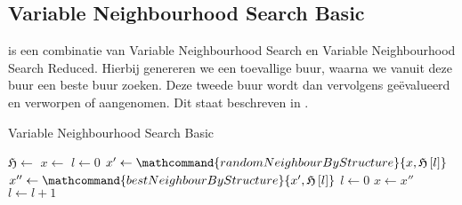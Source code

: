 \subsection{Variable Neighbourhood Search Basic}
 is een combinatie van Variable Neighbourhood Search en Variable Neighbourhood Search Reduced. Hierbij genereren we een toevallige buur, waarna we vanuit deze buur een beste buur zoeken. Deze tweede buur wordt dan vervolgens ge\"evalueerd en verworpen of aangenomen. Dit staat beschreven in .
\begin{algorithm}[htb]                      %
\caption{Variable Neighbourhood Search Basic}          %
\label{alg:variableNeighbourhoodSearchBasic}                           %
\begin{algorithmic}[1]                    %
\STATE $\mathfrak{H}\leftarrow$
\STATE $x\leftarrow$
\STATE $l\leftarrow 0$
\STATE $x'\leftarrow\mathcommand{randomNeighbourByStructure}{x,\mathfrak{H}\left[l\right]}$
\STATE $x''\leftarrow\mathcommand{bestNeighbourByStructure}{x',\mathfrak{H}\left[l\right]}$
\STATE $l\leftarrow 0$
\STATE $x\leftarrow x''$
\ELSE
\STATE $l\leftarrow l+1$
\ENDIF
\ENDWHILE
\end{algorithmic}
\end{algorithm}
